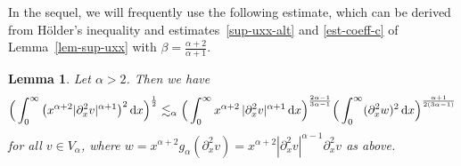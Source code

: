 \documentclass[reqno,12pt]{amsart}
\renewcommand{\d}{\ensuremath{\mathrm{d}}}
\renewcommand{\d}{\ensuremath{{\rm d}}}
\newtheorem{lemma}[theorem]{Lemma}
\numberwithin{equation}{section}
\begin{document}
In the sequel, we will frequently use the following estimate, which can be derived from H\"older's inequality and estimates~\eqref{sup-uxx-alt} and \eqref{est-coeff-c} of Lemma~\ref{lem-sup-uxx} with $\beta= \frac{\alpha+2}{\alpha+1}$.
%
\begin{lemma}\label{lem:con-lem-sup-uxx}
Let $\alpha > 2$. Then we have
%
\begin{equation}\label{eq:con-lem-sup-uxx}
    \Big(\int_0^\infty \big(x^{\alpha+2} |\partial_x^2 v|^{\alpha +1}\big)^2 \, \d x\Big)^{\frac{1}{2}} \lesssim_\alpha 
    \Big(\int_0^\infty x^{\alpha +2} \, |\partial_x^2 v|^{\alpha +1} \, \d x\Big)^{\frac{2\alpha-1}{3\alpha-1}} 
    \Big(\int_0^\infty (\partial_x^2 w)^2 \, \d x\Big)^{\frac{\alpha+1}{2(3\alpha-1)}}
\end{equation}
%
for all $v \in V_\alpha$, where $w = x^{\alpha+2} g_\alpha(\partial_x^2 v) = x^{\alpha+2} |\partial_x^2 v|^{\alpha-1} \partial_x^2 v$ as above.
\end{lemma}
\end{document}
